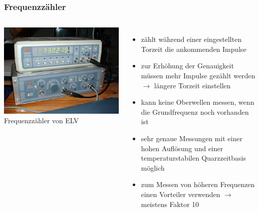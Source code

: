 \begin{frame}
  \frametitle{Frequenzzähler}
  \begin{columns}
    \begin{center}
      \includegraphics[width=\textwidth,height=.8\textheight,keepaspectratio]{a16/Frequenzzaehler.jpg}\\
      {\tiny Frequenzzähler von ELV \href{refs}{\cite{wmen}}}
    \end{center}
    \begin{itemize}
      \item zählt während einer eingestellten Torzeit die ankommenden Impulse
      \item zur Erhöhung der Genauigkeit müssen mehr Impulse gezählt werden $\rightarrow$ längere Torzeit einstellen
      \item kann keine Oberwellen messen, wenn die Grundfrequenz noch vorhanden ist
      \item sehr genaue Messungen mit einer hohen Auflösung und einer temperaturstabilen Quarzzeitbasis möglich
      \item zum Messen von höheren Frequenzen einen Vorteiler verwenden $\rightarrow$ meistens Faktor 10
    \end{itemize}
  \end{columns}
\end{frame}

